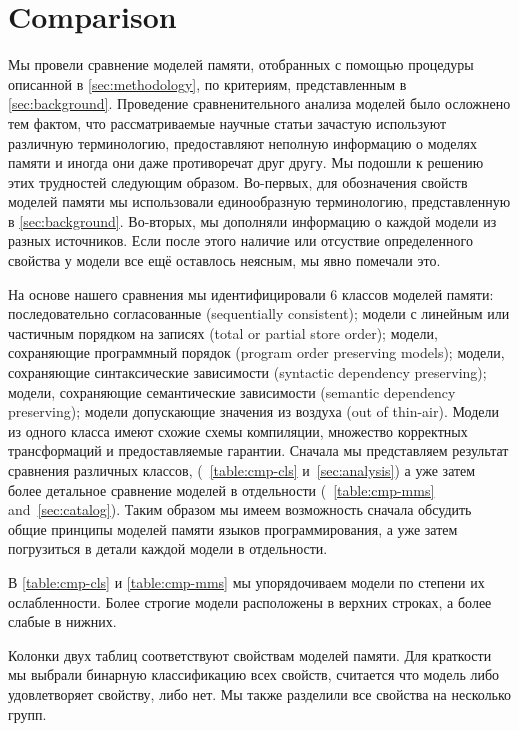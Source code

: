 \section{Comparison}
\label{sec:comparison}

Мы провели сравнение моделей памяти, 
отобранных с помощью процедуры описанной в \cref{sec:methodology},
по критериям, представленным в \cref{sec:background}. 
Проведение сравненительного анализа моделей было 
осложнено тем фактом, что рассматриваемые 
научные статьи зачастую используют различную терминологию, 
предоставляют неполную информацию о моделях памяти 
и иногда они даже противоречат друг другу. 
Мы подошли к решению этих трудностей следующим образом. 
Во-первых, для обозначения свойств моделей памяти
мы использовали единообразную терминологию,
представленную в \cref{sec:background}.
Во-вторых, мы дополняли информацию о каждой модели 
из разных источников. Если после этого 
наличие или отсуствие определенного свойства у модели 
все ещё оставлось неясным, мы явно помечали это. 

На основе нашего сравнения мы идентифицировали 6 классов моделей памяти:
последовательно согласованные (sequentially consistent); 
модели с линейным или частичным порядком на записях
(total or partial store order);
модели, сохраняющие программный порядок
(program order preserving models); 
модели, сохраняющие синтаксические зависимости 
(syntactic dependency preserving);
модели, сохраняющие семантические зависимости
(semantic dependency preserving);
модели допускающие значения из воздуха
(out of thin-air). 
Модели из одного класса имеют схожие схемы компиляции, 
множество корректных трансформаций и предоставляемые гарантии. 
Сначала мы представляем результат сравнения различных классов, 
(\see~\cref{table:cmp-cls} и~\cref{sec:analysis})
а уже затем более детальное сравнение моделей в отдельности
(\see~\cref{table:cmp-mms} and~\cref{sec:catalog}).
Таким образом мы имеем возможность сначала обсудить общие 
принципы моделей памяти языков программирования, 
а уже затем погрузиться в детали каждой модели в отдельности. 



В \cref{table:cmp-cls} и \cref{table:cmp-mms} 
мы упорядочиваем модели по степени их ослабленности. 
Более строгие модели расположены в верхних строках, 
а более слабые в нижних.  

Колонки двух таблиц соответствуют свойствам моделей памяти.
Для краткости мы выбрали бинарную классификацию всех свойств,
\ie считается что модель либо удовлетворяет свойству, либо нет. 
Мы также разделили все свойства на несколько групп. 

